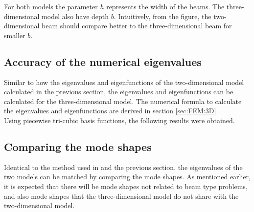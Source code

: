 \documentclass[../../main.tex]{subfiles}
\begin{document}
\begin{figure}[h!]
{{\begin{minipage}[b]{0.7\linewidth}
				
			\end{minipage}
		}
	}
\end{figure}
\FloatBarrier

For both models the parameter $h$ represents the width of the beams. The three-dimensional model also have depth $b$. Intuitively, from the figure, the two-dimensional beam should compare better to the three-dimensional beam for smaller $b$.

\subsection{Accuracy of the numerical eigenvalues}
Similar to how the eigenvalues and eigenfunctions of the two-dimensional model calculated in the previous section, the eigenvalues and eigenfunctions can be calculated for the three-dimensional model. The numerical formula to calculate the eigenvalues and eigenfunctions are derived in section \ref{sec:FEM:3D}.\\

Using piecewise tri-cubic basis functions, the following results were obtained.\\



\subsection{Comparing the mode shapes}
Identical to the method used in \cite{LVV09} and the previous section, the eigenvalues of the two models can be matched by comparing the mode shapes. As mentioned earlier, it is expected that there will be mode shapes not related to beam type problems, and also mode shapes that the three-dimensional model do not share with the two-dimensional model.\\
\end{document}
